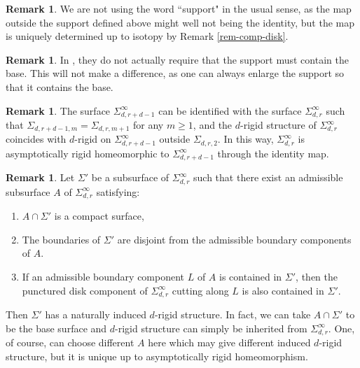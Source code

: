 \documentclass[11pt, a4paper]{amsart}
\theoremstyle{definition}
\newtheorem{rem}[thm]{Remark}
\begin{document}
\begin{rem}
We are not using the word ``support" in the usual sense, as the map outside the support defined above might well not being the identity, but the map is uniquely determined up to isotopy by Remark \ref{rem-comp-disk}.
\end{rem}

\begin{rem}
In \cite[Definition 2.3]{FK04}, they do not actually require that the support must contain the base. This will not make a difference, as one can always enlarge the support so that it contains the base.
\end{rem}

\begin{rem} \label{rem-iso-rgs}
The surface $\Sigma^{\infty}_{d,r+d-1}$ can be identified with the surface $\Sigma^{\infty}_{d,r}$  such that $\Sigma_{d,r+d-1,m} = \Sigma_{d,r,m+1}$ for any $m\geq 1$, and the $d$-rigid structure of  $\Sigma^{\infty}_{d,r}$ coincides with $d$-rigid on $\Sigma^{\infty}_{d,r+d-1}$ outside $\Sigma_{d,r,2}$. In this way, $\Sigma^{\infty}_{d,r}$ is asymptotically rigid homeomorphic to $\Sigma^{\infty}_{d,r+d-1}$ through the identity map.
\end{rem}

\begin{rem}\label{induced-asy-rig-str}
Let $\Sigma'$ be a subsurface of $\Sigma^{\infty}_{d,r}$ such that there exist an admissible subsurface $A$ of $\Sigma^{\infty}_{d,r}$ satisfying:
\begin{enumerate}
     \item $A \cap \Sigma'$ is a compact surface,
     
    \item The boundaries of $\Sigma'$ are disjoint from the admissible boundary components of $A$.
    
    \item If an admissible boundary component $L$ of $A$ is contained in $\Sigma'$, then the punctured disk component of  $\Sigma^{\infty}_{d,r}$ cutting along $L$ is also contained in $\Sigma'$.
\end{enumerate}

Then $\Sigma'$ has a naturally induced $d$-rigid structure. In fact, we can take $A\cap \Sigma'$ to be the base surface and $d$-rigid structure can simply be inherited from $\Sigma^{\infty}_{d,r}$.
One, of course, can choose different $A$ here which may give different induced $d$-rigid structure, but it is unique up to asymptotically rigid homeomorphism. 
\end{rem}
\end{document}
